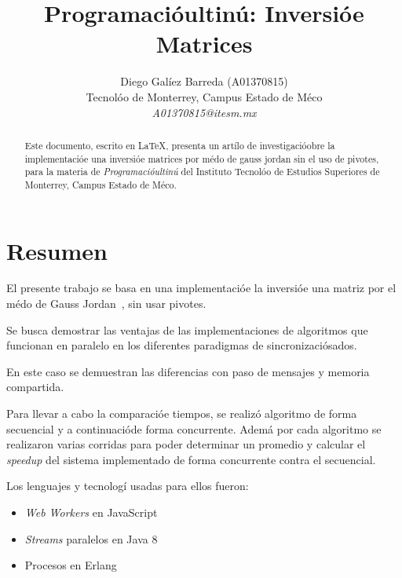 \documentclass[10pt,letterpaper,oneside]{article}
\begin{document}
\renewcommand\abstractname{Resumen}
\renewcommand\refname{Referencias}
\renewcommand{\notesname}{Notas}

\title{Programacióultinú: Inversióe Matrices}
\author{
\Large Diego Galíez Barreda (A01370815)
\\
Tecnolóo de Monterrey, Campus Estado de Méco
\\  
\Large \textit{A01370815@itesm.mx}}  

\maketitle

\begin{abstract}
Este documento, escrito en \LaTeX, presenta un artílo de investigacióobre la implementacióe una inversióe matrices por médo de gauss jordan sin el uso de pivotes, para la materia de \textit{Programacióultinú} del Instituto Tecnolóo de Estudios Superiores de Monterrey, Campus Estado de Méco. 
\end{abstract}

\section{Resumen}

El presente trabajo se basa en una implementacióe la inversióe una matriz por el médo de Gauss Jordan~\cite{algoritmo}, sin usar pivotes.

Se busca demostrar las ventajas de las implementaciones de algoritmos que funcionan en paralelo en los diferentes paradigmas de sincronizaciósados. 

En este caso se demuestran las diferencias con paso de mensajes y memoria compartida.

Para llevar a cabo la comparacióe tiempos, se realizó algoritmo de forma secuencial y a continuacióde forma concurrente. Ademá por cada algoritmo se realizaron varias corridas para poder determinar un promedio y calcular el \emph{speedup} del sistema implementado de forma concurrente contra el secuencial.

Los lenguajes y tecnologí usadas para ellos fueron:

\begin{itemize}
    \item \textit{Web Workers} en JavaScript
    \item \textit{Streams} paralelos en Java 8
    \item Procesos en Erlang
\end{itemize}
\end{document}
